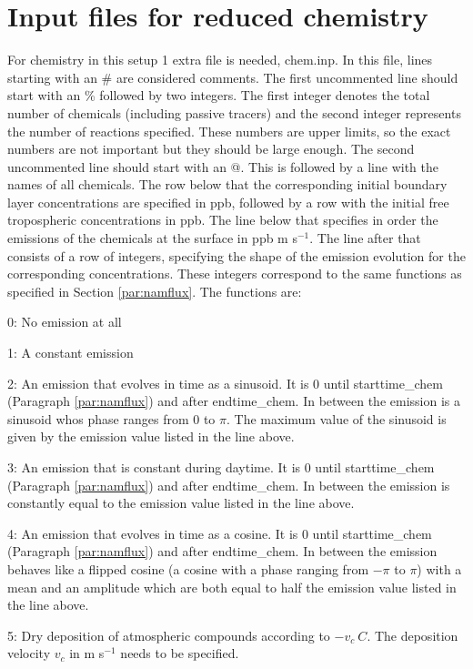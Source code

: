 \documentclass[twoside,11pt,fleqn,a4paper,english,openright]{report}
\begin{document}
\section{Input files for reduced chemistry}\label{par:simple}
For chemistry in this setup 1 extra file is needed, chem.inp. 
In this file, lines starting with an \# are considered comments. 
The first uncommented line should start with an \% followed by two integers. 
The first integer denotes the total number of chemicals (including passive tracers) and the second integer represents the number of reactions specified. 
These numbers are upper limits, so the exact numbers are not important but they should be large enough. 
The second uncommented line should start with an @. 
This is followed by a line with the names of all chemicals. 
The row below that the corresponding initial boundary layer concentrations are specified in ppb, followed by a row with the initial free tropospheric 
concentrations in ppb. The line below that specifies in order the emissions of the chemicals at the surface in ppb m s$^{-1}$. 
The line after that consists of a row of integers, specifying the shape of the emission evolution for the corresponding concentrations. 
These integers correspond to the same functions as specified in Section \ref{par:namflux}. The functions are:
\begin{itemize*}
\item[0:] No emission at all
\item[1:] A constant emission
\item[2:] An emission that evolves in time as a sinusoid. It is 0 until starttime\_chem (Paragraph \ref{par:namflux}) and after endtime\_chem. In between the emission is a sinusoid whos phase ranges from 0 to $\pi$. The maximum value of the sinusoid is given by the emission value listed in the line above.
\item[3:] An emission that is constant during daytime. It is 0 until starttime\_chem (Paragraph \ref{par:namflux}) and after endtime\_chem. In between the emission is constantly equal to the emission value listed in the line above.
\item[4:] An emission that evolves in time as a cosine. It is 0 until starttime\_chem (Paragraph \ref{par:namflux}) and after endtime\_chem. In between the emission behaves like a flipped cosine (a cosine
with a phase ranging from $-\pi$ to $\pi$) with a mean and an amplitude which are both equal to half the emission value listed in the line above.
\item[5:] Dry deposition of atmospheric compounds according to $-v_c~C$. The deposition velocity $v_c$ in m s$^{-1}$ needs to be specified.
\end{itemize*}
\end{document}
